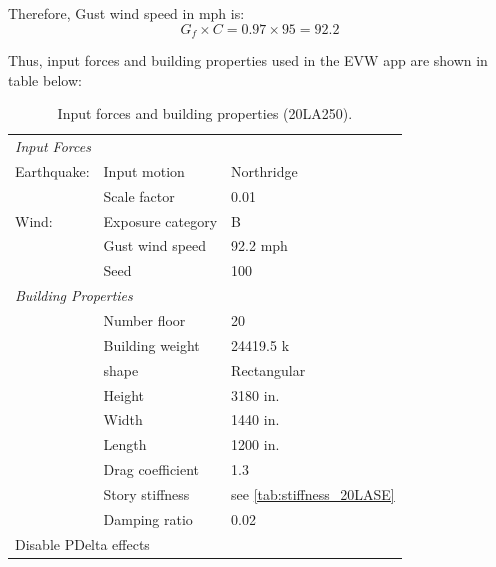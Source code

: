 \documentclass{simcenterdocumentation}
\begin{document}
Therefore, Gust wind speed in mph is:
\begin{equation*}
G_f \times C = 0.97 \times 95 = \boxed{92.2}
\end{equation*}

Thus, input forces and building properties used in the EVW app are shown in table below:

\begin{table}[H]
	\centering \caption{Input forces and building properties (20LA250).}
	\begin{tabular}{lll}
	\toprule
	\multicolumn{3}{l}{\textit{Input Forces}}					\\
	\cmidrule(rl){1-3}
	Earthquake:		& Input motion		& Northridge			\\
					& Scale factor		& 0.01					\\
	Wind:			& Exposure category	& B						\\
					& Gust wind speed	& 92.2 mph				\\
					& Seed				& 100					\\
	\midrule
	\multicolumn{3}{l}{\textit{Building Properties}}			\\
	\cmidrule(rl){1-3}
					& Number floor		& 20					\\
					& Building weight	& 24419.5 k				\\
					& shape				& Rectangular			\\
					& Height			& 3180 in.				\\
					& Width				& 1440 in.				\\
					& Length			& 1200 in.				\\
					& Drag coefficient	& 1.3					\\
					& Story stiffness	& see \cref{tab:stiffness_20LASE}			\\
					& Damping ratio		& 0.02					\\
	\midrule
	\multicolumn{3}{l}{Disable PDelta effects}					\\
	\bottomrule
	\end{tabular}
\end{table}
\end{document}
